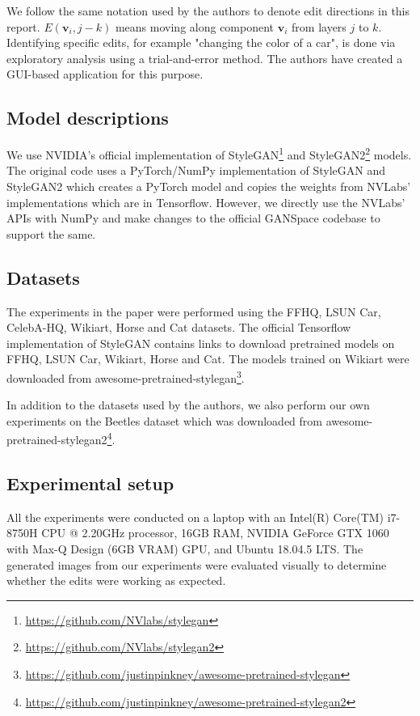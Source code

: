 We follow the same notation used by the authors to denote edit directions in this report. $E(\mathbf{v}_{i}, j-k)$ means moving along component $\mathbf{v}_{i}$ from layers $j$ to $k$. Identifying specific edits, for example "changing the color of a car", is done via exploratory analysis using a trial-and-error method. The authors have created a GUI-based application for this purpose.

\subsection{Model descriptions}

We use NVIDIA's official implementation of StyleGAN\footnote{\url{https://github.com/NVlabs/stylegan}} and StyleGAN2\footnote{\url{https://github.com/NVlabs/stylegan2}} models.
The original code uses a PyTorch/NumPy implementation of StyleGAN and StyleGAN2 which creates a PyTorch model and copies the weights from NVLabs' implementations which are in Tensorflow. However, we directly use the NVLabs' APIs with NumPy and make changes to the official GANSpace codebase to support the same.

\subsection{Datasets}

The experiments in the paper were performed using the FFHQ, LSUN Car, CelebA-HQ, Wikiart, Horse and Cat datasets. The official Tensorflow implementation of StyleGAN contains links to download pretrained models on FFHQ, LSUN Car, Wikiart, Horse and Cat. The models trained on Wikiart were downloaded from awesome-pretrained-stylegan\footnote{\url{https://github.com/justinpinkney/awesome-pretrained-stylegan}}.

In addition to the datasets used by the authors, we also perform our own experiments on the Beetles dataset which was downloaded from awesome-pretrained-stylegan2\footnote{\url{https://github.com/justinpinkney/awesome-pretrained-stylegan2}}.


\subsection{Experimental setup}

All the experiments were conducted on a laptop with an Intel(R) Core(TM) i7-8750H CPU @ 2.20GHz processor, 16GB RAM, NVIDIA GeForce GTX 1060 with Max-Q Design (6GB VRAM) GPU, and Ubuntu 18.04.5 LTS. The generated images from our experiments were evaluated visually to determine whether the edits were working as expected.

